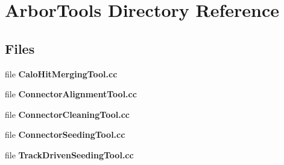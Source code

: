 \section{Arbor\+Tools Directory Reference}
\label{dir_a807fe5b13b2095839e1191d98b0b06e}
\subsection*{Files}
\begin{DoxyCompactItemize}
\item 
file {\bf Calo\+Hit\+Merging\+Tool.\+cc}
\item 
file {\bf Connector\+Alignment\+Tool.\+cc}
\item 
file {\bf Connector\+Cleaning\+Tool.\+cc}
\item 
file {\bf Connector\+Seeding\+Tool.\+cc}
\item 
file {\bf Track\+Driven\+Seeding\+Tool.\+cc}
\end{DoxyCompactItemize}
